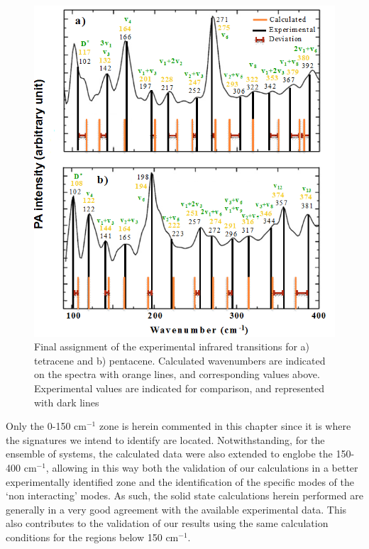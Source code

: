  \begin{figure}[H]
 	\centering
 	\includegraphics[scale=0.8]{image/final-exp}
 	\caption[Final assignment of the experimental infrared transitions for tetracene and pentacene]{Final assignment of the experimental infrared transitions for a) tetracene and b) pentacene. Calculated wavenumbers are indicated on the spectra with orange lines, and corresponding values above. Experimental values are indicated for comparison, and represented with dark lines} \label{figure9}
 \end{figure}

Only the 0-150 cm$^{-1}$ zone is herein commented in this chapter since it is where the signatures we intend to identify are located. Notwithstanding, for the ensemble of systems, the calculated data were also extended to englobe the 150-400 cm$^{-1}$, allowing in this way both the validation of our calculations in a better experimentally identified zone and the identification of the specific modes of the ‘non interacting’ modes. As such, the solid state calculations herein performed are generally in a very good agreement with the available experimental data. This also contributes to the validation of our results using the same calculation conditions for the regions below 150 cm$^{-1}$.\\




